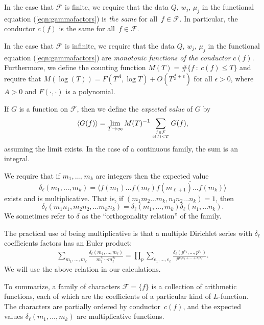 \documentclass[12pt,letterpaper]{amsart}
\theoremstyle{plain}
\theoremstyle{definition}
\theoremstyle{remark}
\numberwithin{equation}{subsection}
\numberwithin{theorem}{subsection}
\numberwithin{table}{subsection}
\newcommand{\ontop}[2]{\genfrac{}{}{0pt}{}{#1}{#2}}
\begin{document}
In the case that  $\mathcal{F}$ is finite, we
require that the data $Q$, $w_j$, $\mu_j$ in the functional equation
(\ref{eqn:gammafactors}) is \emph{the same}  for all~$f\in \mathcal{F}$.
In particular,
the conductor
$c(f)$ is the same for all~$f\in \mathcal{F}$.

In the case that  $\mathcal{F}$ is infinite, we require that
the data $Q$, $w_j$, $\mu_j$ in the functional equation
(\ref{eqn:gammafactors}) are \emph{monotonic functions of the 
conductor} $c(f)$.  Furthermore, we
define the counting function 
$ M(T)=\#\{f\ :\ c(f)\le T\}$ and
require that  $M(\log(T))= F(T^A, \log T) + O(T^{\frac{A}{2}+\epsilon})$ 
for all $\epsilon>0$,
where $A>0$ and $F(\cdot,\cdot)$ is a polynomial.

If $G$ is a function on $\mathcal{F}$, then we define the
{\it expected value} of $G$ by
\begin{equation}
\langle G(f)\rangle =
\lim_{T\to \infty}
M(T)^{-1}\sum_{\ontop{f\in \mathcal{F}}{c(f)<T}}
G(f) ,
\end{equation}
assuming the limit exists.  In the case of a continuous family, the
sum is an integral.  

We require that if $m_1,\dots,m_k$ are integers then
the expected value
\begin{equation}
\delta_{\ell}(m_1,\dots,m_k)
=
\langle f(m_1)\dots
f(m_\ell)\overline{f(m_{\ell+1})\dots f(m_k)} \rangle 
\end{equation}
exists and is multiplicative.  That is,
if $(m_1 m_2 \dots m_k, n_1 n_2 \dots n_k)=1$, then
\begin{equation}\label{eqn:deltamultiplicative}
\delta_\ell(m_1n_1,m_2n_2,\dots m_kn_k)=
\delta_\ell(m_1,\dots,m_k)\delta_\ell(n_1,\dots n_k).
\end{equation}
We sometimes refer to $\delta$ as the ``orthogonality relation''
of the family.

The practical use of being multiplicative is that a multiple Dirichlet
series with $\delta_\ell$ coefficients factors has an Euler product:
\begin{eqnarray}\label{eqn:multipleEP}
\sum_{m_1,\ldots,m_\ell} 
\frac{\delta_\ell(m_1,\ldots,m_\ell)}{m_1^{s_1}\cdots m_\ell^{s_\ell}}
=
\prod_p \sum_{e_1,\ldots,e_\ell} 
\frac{\delta_\ell(p^{e_1},\ldots,p^{e_\ell})}{p^{e_1s_1+\cdots+e_\ell s_\ell}} .
\end{eqnarray}
We will use the above relation in our calculations.

To summarize, a family of characters $ \mathcal{F}=\{f\}$  is a 
collection of arithmetic
functions, each of which are the coefficients of a particular
kind of $L$-function.  The characters are partially ordered 
by conductor~$c(f)$, and the expected values
$\delta_\ell(m_1,\dots,m_k)$ are multiplicative functions.
\end{document}
